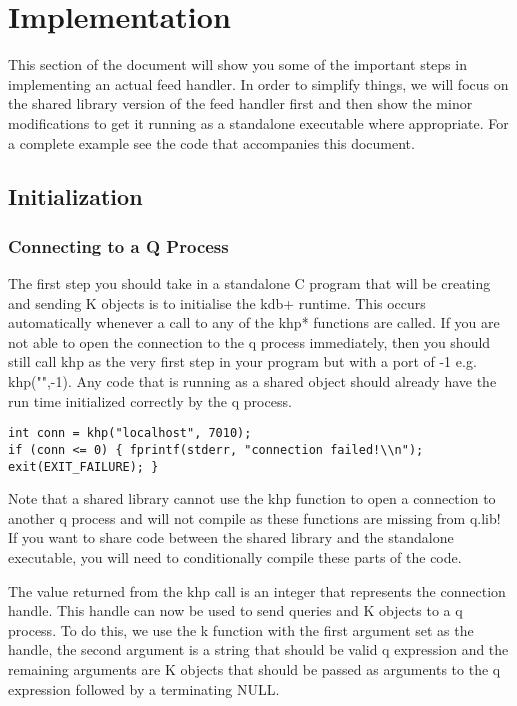 \chapter{Implementation}

This section of the document will show you some of the important steps in implementing an actual
feed handler. In order to simplify things, we will focus on the shared library version of the feed
handler first and then show the minor modifications to get it running as a standalone executable
where appropriate. For a complete example see the code that accompanies this document.

\section{Initialization}

\subsection{Connecting to a Q Process}

The first step you should take in a standalone C program that will be creating and sending K objects
is to initialise the kdb+ runtime. This occurs automatically whenever a call to any of the khp* functions
are called. If you are not able to open the connection to the q process immediately, then you should still
call khp as the very first step in your program but with a port of -1 e.g. khp("",-1). Any code that is
running as a shared object should already have the run time initialized correctly by the q process.

\begin{lstlisting}
int conn = khp("localhost", 7010);
if (conn <= 0) { fprintf(stderr, "connection failed!\\n"); exit(EXIT_FAILURE); }
\end{lstlisting}

Note that a shared library cannot use the khp function to open a connection to another q process and
will not compile as these functions are missing from q.lib! If you want to share code between the shared
library and the standalone executable, you will need to conditionally compile these parts of the code.

The value returned from the khp call is an integer that represents the connection handle. This handle
can now be used to send queries and K objects to a q process. To do this, we use the k function with
the first argument set as the handle, the second argument is a string that should be valid q expression
and the remaining arguments are K objects that should be passed as arguments to the q expression followed
by a terminating NULL.

